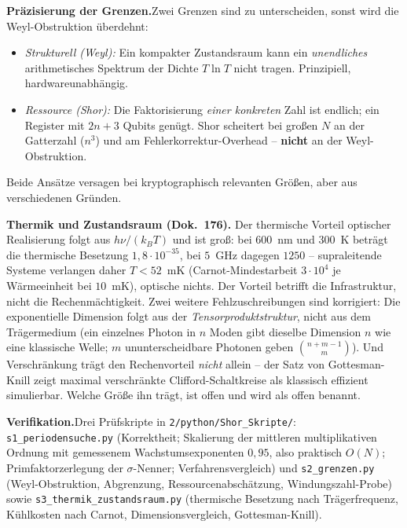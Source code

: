 \smallskip\noindent\textbf{Pr\"azisierung der Grenzen.}\quad Zwei Grenzen
sind zu unterscheiden, sonst wird die Weyl-Obstruktion \"uberdehnt:
\begin{itemize}
  \item \emph{Strukturell (Weyl):} Ein kompakter Zustandsraum kann ein
    \emph{unendliches} arithmetisches Spektrum der Dichte $T\ln T$ nicht
    tragen. Prinzipiell, hardwareunabh\"angig.
  \item \emph{Ressource (Shor):} Die Faktorisierung \emph{einer konkreten}
    Zahl ist endlich; ein Register mit $2n+3$ Qubits gen\"ugt. Shor scheitert
    bei gro\ss en $N$ an der Gatterzahl ($n^3$) und am
    Fehlerkorrektur-Overhead -- \textbf{nicht} an der Weyl-Obstruktion.
\end{itemize}
Beide Ans\"atze versagen bei kryptographisch relevanten Gr\"o\ss en, aber aus
verschiedenen Gr\"unden.

\smallskip\noindent\textbf{Thermik und Zustandsraum (Dok.~176).}\quad
Der thermische Vorteil optischer Realisierung folgt aus $h\nu/(k_BT)$ und
ist gro\ss: bei $600$~nm und $300$~K betr\"agt die thermische Besetzung
$1{,}8\cdot10^{-35}$, bei $5$~GHz dagegen $1250$ -- supraleitende Systeme
verlangen daher $T < 52$~mK (Carnot-Mindestarbeit $3\cdot10^{4}$ je
W\"armeeinheit bei $10$~mK), optische nichts. Der Vorteil betrifft die
Infrastruktur, nicht die Rechenm\"achtigkeit. Zwei weitere
Fehlzuschreibungen sind korrigiert: Die exponentielle Dimension folgt aus
der \emph{Tensorproduktstruktur}, nicht aus dem Tr\"agermedium (ein einzelnes
Photon in $n$ Moden gibt dieselbe Dimension $n$ wie eine klassische Welle;
$m$ ununterscheidbare Photonen geben $\binom{n+m-1}{m}$). Und
Verschr\"ankung tr\"agt den Rechenvorteil \emph{nicht} allein -- der Satz von
Gottesman-Knill zeigt maximal verschr\"ankte Clifford-Schaltkreise als
klassisch effizient simulierbar. Welche Gr\"o\ss e ihn tr\"agt, ist offen und
wird als offen benannt.

\smallskip\noindent\textbf{Verifikation.}\quad Drei Pr\"ufskripte in
\texttt{2/python/Shor\_Skripte/}: \texttt{s1\_periodensuche.py} (Korrektheit;
Skalierung der mittleren multiplikativen Ordnung mit gemessenem
Wachstumsexponenten $0{,}95$, also praktisch $O(N)$; Primfaktorzerlegung der
$\sigma$-Nenner; Verfahrensvergleich) und \texttt{s2\_grenzen.py}
(Weyl-Obstruktion, Abgrenzung, Ressourcenabsch\"atzung, Windungszahl-Probe)
sowie \texttt{s3\_thermik\_zustandsraum.py} (thermische Besetzung nach
Tr\"agerfrequenz, K\"uhlkosten nach Carnot, Dimensionsvergleich,
Gottesman-Knill).

